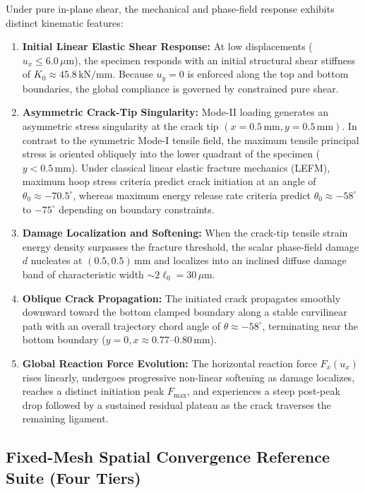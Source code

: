 Under pure in-plane shear, the mechanical and phase-field response exhibits distinct kinematic features:
\begin{enumerate}
  \item \textbf{Initial Linear Elastic Shear Response:} At low displacements ($u_x \le 6.0\,\mu\mathrm{m}$), the specimen responds with an initial structural shear stiffness of $K_0 \approx 45.8\,\mathrm{kN/mm}$. Because $u_y = 0$ is enforced along the top and bottom boundaries, the global compliance is governed by constrained pure shear.
  \item \textbf{Asymmetric Crack-Tip Singularity:} Mode-II loading generates an asymmetric stress singularity at the crack tip $(x=0.5\,\mathrm{mm}, y=0.5\,\mathrm{mm})$. In contrast to the symmetric Mode-I tensile field, the maximum tensile principal stress is oriented obliquely into the lower quadrant of the specimen ($y < 0.5\,\mathrm{mm}$). Under classical linear elastic fracture mechanics (LEFM), maximum hoop stress criteria predict crack initiation at an angle of $\theta_0 \approx -70.5^\circ$, whereas maximum energy release rate criteria predict $\theta_0 \approx -58^\circ$ to $-75^\circ$ depending on boundary constraints.
  \item \textbf{Damage Localization and Softening:} When the crack-tip tensile strain energy density surpasses the fracture threshold, the scalar phase-field damage $d$ nucleates at $(0.5, 0.5)\,\mathrm{mm}$ and localizes into an inclined diffuse damage band of characteristic width $\sim 2\ell_0 = 30\,\mu\mathrm{m}$.
  \item \textbf{Oblique Crack Propagation:} The initiated crack propagates smoothly downward toward the bottom clamped boundary along a stable curvilinear path with an overall trajectory chord angle of $\theta \approx -58^\circ$, terminating near the bottom boundary ($y = 0, x \approx 0.77\text{--}0.80\,\mathrm{mm}$).
  \item \textbf{Global Reaction Force Evolution:} The horizontal reaction force $F_x(u_x)$ rises linearly, undergoes progressive non-linear softening as damage localizes, reaches a distinct initiation peak $F_{\max}$, and experiences a steep post-peak drop followed by a sustained residual plateau as the crack traverses the remaining ligament.
\end{enumerate}

\subsection{Fixed-Mesh Spatial Convergence Reference Suite (Four Tiers)}
\label{subsec:mode2_fixed_mesh_suite}

